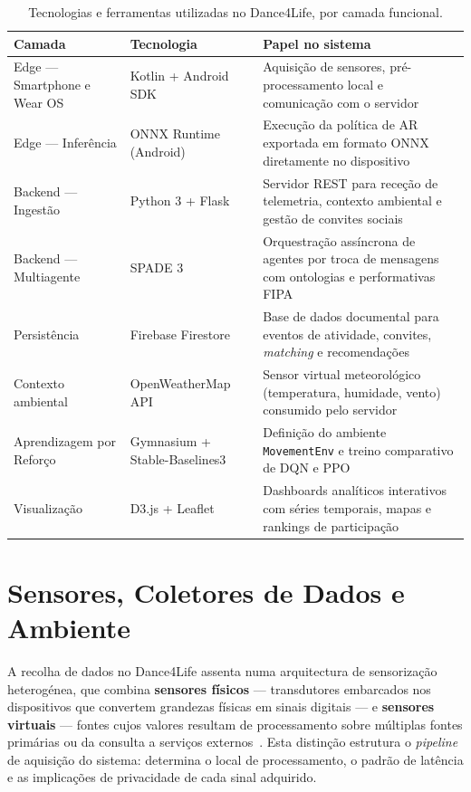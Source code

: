 \documentclass[runningheads]{llncs}
\begin{document}
\begin{table}[t]
\centering
\caption{Tecnologias e ferramentas utilizadas no Dance4Life, por camada funcional.}\label{tab:tecnologias}
\begin{tabular}{|p{2.8cm}|p{3.0cm}|p{6.5cm}|}
\hline
\textbf{Camada} & \textbf{Tecnologia} & \textbf{Papel no sistema}\\
\hline
Edge --- Smartphone e Wear OS & Kotlin + Android SDK & Aquisição de sensores, pré-processamento local e comunicação com o servidor\\
\hline
Edge --- Inferência & ONNX Runtime (Android) & Execução da política de AR exportada em formato ONNX diretamente no dispositivo\\
\hline
Backend --- Ingestão & Python 3 + Flask & Servidor REST para receção de telemetria, contexto ambiental e gestão de convites sociais\\
\hline
Backend --- Multiagente & SPADE 3 & Orquestração assíncrona de agentes por troca de mensagens com ontologias e performativas FIPA\\
\hline
Persistência & Firebase Firestore & Base de dados documental para eventos de atividade, convites, \textit{matching} e recomendações\\
\hline
Contexto ambiental & OpenWeatherMap API & Sensor virtual meteorológico (temperatura, humidade, vento) consumido pelo servidor\\
\hline
Aprendizagem por Reforço & Gymnasium + Stable-Baselines3 & Definição do ambiente \texttt{MovementEnv} e treino comparativo de DQN e PPO\\
\hline
Visualização & D3.js + Leaflet & Dashboards analíticos interativos com séries temporais, mapas e rankings de participação\\
\hline
\end{tabular}
\end{table}

\section{Sensores, Coletores de Dados e Ambiente}
A recolha de dados no Dance4Life assenta numa arquitectura de sensorização heterogénea, que combina \textbf{sensores físicos} --- transdutores embarcados nos dispositivos que convertem grandezas físicas em sinais digitais --- e \textbf{sensores virtuais} --- fontes cujos valores resultam de processamento sobre múltiplas fontes primárias ou da consulta a serviços externos~\cite{bouchabou2021}. Esta distinção estrutura o \textit{pipeline} de aquisição do sistema: determina o local de processamento, o padrão de latência e as implicações de privacidade de cada sinal adquirido.
\end{document}
